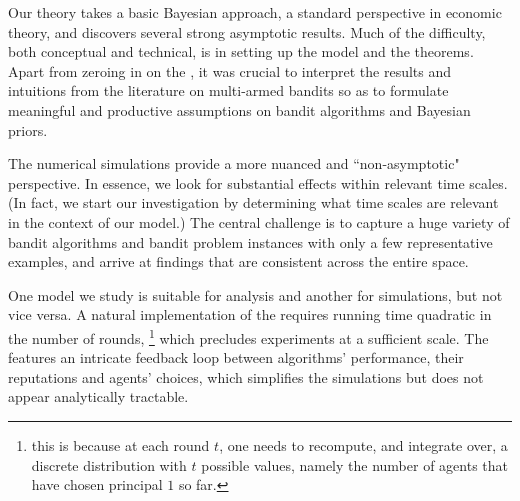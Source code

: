 Our theory takes a basic Bayesian approach, a standard perspective in economic theory, and discovers several strong asymptotic results. Much of the difficulty, both conceptual and technical, is in setting up the model and the theorems. Apart from zeroing in on the \TheoryModel, it was crucial to interpret the results and intuitions from the literature on multi-armed bandits so as to formulate meaningful and productive assumptions on bandit algorithms and Bayesian priors.

The numerical simulations provide a more nuanced and ``non-asymptotic" perspective. In essence, we look for substantial effects within relevant time scales. (In fact, we start our investigation by determining what time scales are relevant in the context of our model.) The central challenge is to capture a huge variety of bandit algorithms and bandit problem instances with only a few representative examples, and arrive at findings that are consistent across the entire space.

One model we study is suitable for analysis and another for simulations, but not vice versa. A natural implementation of the \TheoryModel requires running time quadratic in the number of rounds,%
\footnote{\label{fn:Tsquared}\Eg this is because at each round $t$, one needs to recompute, and integrate over, a discrete distribution with $t$ possible values, namely the number of agents that have chosen principal $1$ so far.}
which precludes experiments at a sufficient scale. The \ExptsModel features an intricate feedback loop between algorithms' performance, their reputations and agents' choices, which simplifies the simulations but does not appear analytically tractable.


